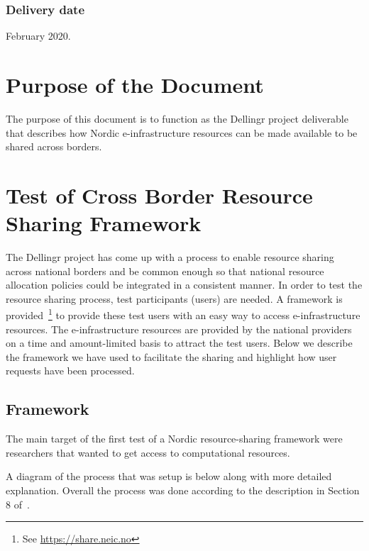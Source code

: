 \documentclass{article}
\newcommand{\dell}{Dellingr\xspace}
\newcommand{\einfra}{e-infrastructure\xspace}
\newcommand{\np}{national provider\xspace}
\newcommand{\nps}{\np{s}\xspace}
\newcommand{\pilot}{first test of a Nordic resource-sharing framework\xspace}
\begin{document}
\subsubsection{Delivery date}

February 2020.

\section{Purpose of the Document}

The purpose of this document is to function as the \dell project deliverable that describes how Nordic \einfra resources
can be made available to be shared across borders.

\section{Test of Cross Border Resource Sharing Framework}

The \dell project has come up with a process to enable resource sharing across national borders and be common enough so that national resource allocation policies could be integrated in a consistent manner.
In order to test the resource sharing process, test participants (users) are needed.
A framework is provided~\footnote{See \url{https://share.neic.no}} to provide these test users with an easy way to access \einfra resources.
The \einfra resources are provided by the \nps on a time and amount-limited basis to attract the test users.
Below we describe the framework we have used to facilitate the sharing and highlight how user requests have been processed.

\subsection{Framework}
\label{ssec:framework}

The main target of the \pilot were researchers that wanted to get access to computational resources.

A diagram of the process that was setup is below along with more detailed explanation. 
Overall the process was done according to the description in Section 8 
of~\cite{dellingr-p2-do5}.
\end{document}
